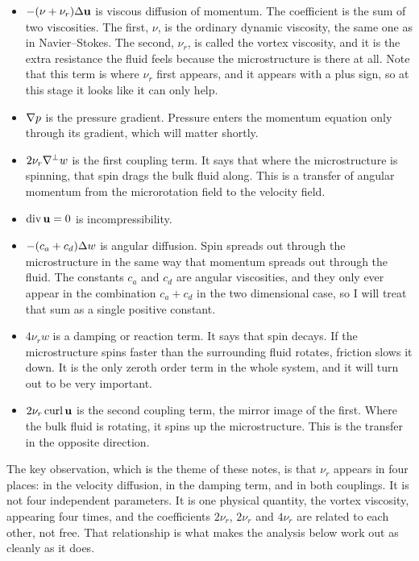 \documentclass[11pt,a4paper]{article}
\begin{document}
\begin{itemize}

\item $-(\nu + \nu_{r}) \Delta \mathbf{u}$ is viscous diffusion of momentum. The
coefficient is the sum of two viscosities. The first, $\nu$, is the ordinary
dynamic viscosity, the same one as in Navier--Stokes. The second, $\nu_{r}$, is
called the vortex viscosity, and it is the extra resistance the fluid feels
because the microstructure is there at all. Note that this term is where
$\nu_{r}$ first appears, and it appears with a plus sign, so at this stage it
looks like it can only help.

\item $\nabla p$ is the pressure gradient. Pressure enters the momentum equation
only through its gradient, which will matter shortly.

\item $2\nu_{r}\nabla^{\perp} w$ is the first coupling term. It says that where
the microstructure is spinning, that spin drags the bulk fluid along. This is a
transfer of angular momentum from the microrotation field to the velocity field.

\item $\operatorname{div} \mathbf{u} = 0$ is incompressibility.

\item $-(c_{a} + c_{d}) \Delta w$ is angular diffusion. Spin spreads out through
the microstructure in the same way that momentum spreads out through the fluid.
The constants $c_{a}$ and $c_{d}$ are angular viscosities, and they only ever
appear in the combination $c_{a} + c_{d}$ in the two dimensional case, so I will
treat that sum as a single positive constant.

\item $4\nu_{r} w$ is a damping or reaction term. It says that spin decays. If
the microstructure spins faster than the surrounding fluid rotates, friction
slows it down. It is the only zeroth order term in the whole system, and it will
turn out to be very important.

\item $2\nu_{r} \operatorname{curl} \mathbf{u}$ is the second coupling term, the mirror image of the
first. Where the bulk fluid is rotating, it spins up the microstructure. This is
the transfer in the opposite direction.

\end{itemize}

The key observation, which is the theme of these notes, is that $\nu_{r}$
appears in four places: in the velocity diffusion, in the damping term, and in
both couplings. It is not four independent parameters. It is one physical
quantity, the vortex viscosity, appearing four times, and the coefficients
$2\nu_{r}$, $2\nu_{r}$ and $4\nu_{r}$ are related to each other, not free. That
relationship is what makes the analysis below work out as cleanly as it does.
\end{document}
